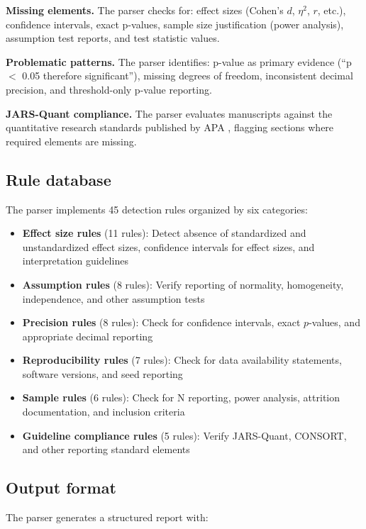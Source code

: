\documentclass[article]{jss}
\begin{document}
\textbf{Missing elements.} The parser checks for: effect sizes (Cohen's $d$, $\eta^2$, $r$, etc.), confidence intervals, exact p-values, sample size justification (power analysis), assumption test reports, and test statistic values.

\textbf{Problematic patterns.} The parser identifies: p-value as primary evidence (``p $<$ 0.05 therefore significant''), missing degrees of freedom, inconsistent decimal precision, and threshold-only p-value reporting.

\textbf{JARS-Quant compliance.} The parser evaluates manuscripts against the quantitative research standards published by APA \citep{appelbaum2018jars}, flagging sections where required elements are missing.

\subsection{Rule database}

The parser implements 45 detection rules organized by six categories:

\begin{itemize}
\item \textbf{Effect size rules} (11 rules): Detect absence of standardized and unstandardized effect sizes, confidence intervals for effect sizes, and interpretation guidelines
\item \textbf{Assumption rules} (8 rules): Verify reporting of normality, homogeneity, independence, and other assumption tests
\item \textbf{Precision rules} (8 rules): Check for confidence intervals, exact $p$-values, and appropriate decimal reporting
\item \textbf{Reproducibility rules} (7 rules): Check for data availability statements, software versions, and seed reporting
\item \textbf{Sample rules} (6 rules): Check for N reporting, power analysis, attrition documentation, and inclusion criteria
\item \textbf{Guideline compliance rules} (5 rules): Verify JARS-Quant, CONSORT, and other reporting standard elements
\end{itemize}

\subsection{Output format}

The parser generates a structured report with:
\end{document}
